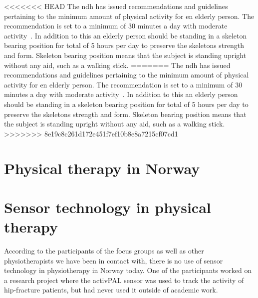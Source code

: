 <<<<<<< HEAD
The \gls{ndh} has issued recommendations and guidelines pertaining to the minimum amount of physical activity for en elderly person. The recommendation is set to a minimum of 30 minutes a day with moderate activity~\cite{helsedirektoratetFysiskAktivitet}. In addition to this an elderly person should be standing in a skeleton bearing position for total of 5 hours per day to preserve the skeletons strength and form. Skeleton bearing position means that the subject is standing upright without any aid, such as a walking stick.
=======
The \gls{ndh} has issued recommendations and guidelines pertaining to the minimum amount of physical activity for en elderly person. The recommendation is set to a minimum of 30 minutes a day with moderate activity~\cite{helsedirektoratetFysiskAktivitet}. In addition to this an elderly person should be standing in a skeleton bearing position for total of 5 hours per day to preserve the skeletons strength and form. Skeleton bearing position means that the subject is standing upright without any aid, such as a walking stick.  
>>>>>>> 8e19c8c261d172e451f7ef10b8e8a7215cf07cd1

\section{Physical therapy in Norway}

\section{Sensor technology in physical therapy}
According to the participants of the focus groups as well as other physiotherapists we have been in contact with, there is no use of sensor technology in physiotherapy in Norway today. One of the participants worked on a research project where the activPAL sensor was used to track the activity of hip-fracture patients, but had never used it outside of academic work.


